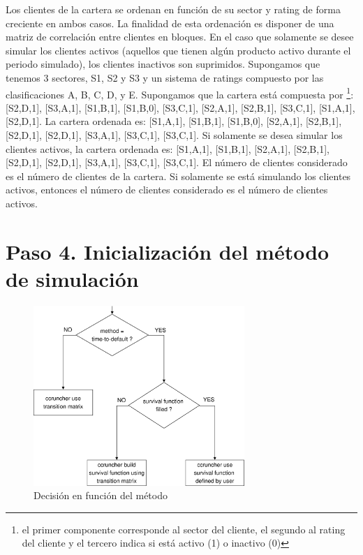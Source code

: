 Los clientes de la cartera se ordenan en funci\'on de su sector
y rating de forma creciente en ambos casos. La finalidad de esta
ordenaci\'on es disponer de una matriz de correlaci\'on entre
clientes en bloques. En el caso que solamente se desee simular
los clientes activos (aquellos que tienen alg\'un producto activo
durante el periodo simulado), los clientes inactivos son
suprimidos.
\newline
\newline
Supongamos que tenemos 3 sectores, S1, S2 y S3 y un sistema de
ratings compuesto por las clasificaciones A, B, C, D, y E.
Supongamos que la cartera est\'a compuesta por \footnote{el
primer componente corresponde al sector del cliente, el segundo al
rating del cliente y el tercero indica si est\'a activo (1) o inactivo (0)}:
[S2,D,1], [S3,A,1], [S1,B,1], [S1,B,0], [S3,C,1], [S2,A,1], [S2,B,1], [S3,C,1],
[S1,A,1], [S2,D,1].
\newline
\newline
La cartera ordenada es:
[S1,A,1], [S1,B,1], [S1,B,0], [S2,A,1], [S2,B,1], [S2,D,1], [S2,D,1],
[S3,A,1], [S3,C,1], [S3,C,1].
\newline
\newline
Si solamente se desea simular los clientes activos, la cartera ordenada es:
[S1,A,1], [S1,B,1], [S2,A,1], [S2,B,1], [S2,D,1], [S2,D,1], [S3,A,1],
[S3,C,1], [S3,C,1].
\newline
\newline
El n\'umero de clientes considerado es el n\'umero de clientes de la cartera.
Si solamente se est\'a simulando los clientes activos, entonces el n\'umero
de clientes considerado es el n\'umero de clientes activos.


\section{Paso 4. Inicializaci\'on del m\'etodo de simulaci\'on}

\begin{figure}[!hb]
\begin{center}
\includegraphics[width=8cm,angle=0]{./images/decisiontree1.eps}
\caption{Decisi\'on en funci\'on del m\'etodo}
\label{decisiontree1}
\end{center}
\end{figure}

